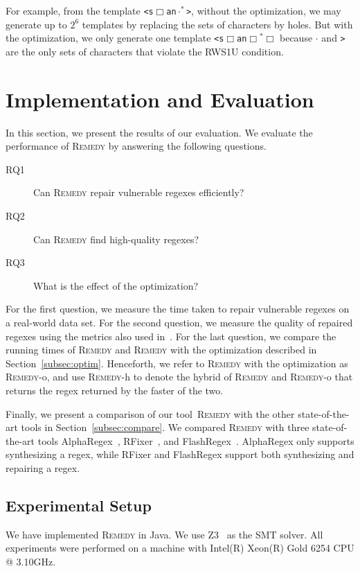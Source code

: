 \documentclass[conference]{IEEEtran}
\newcommand{\tool}{\textsc{Remedy}}
\newcommand{\hole}{\Box}
\newcommand{\any}{\cdot}
\newcommand{\ltp}{RWS1U}
\begin{document}
For example, from the template \texttt{<s$\hole{}$an$\any^*$>}, without the optimization, we may generate up to $2^6$ templates by replacing the sets of characters by holes.
But with the optimization, we only generate one template \texttt{<s$\hole{}$an$\hole{}^*\hole{}$} because $\any$ and \texttt{>} are the only sets of characters that violate the \ltp{} condition.


  


\section{Implementation and Evaluation}
\label{sec:eval}



In this section, we present the results of our evaluation.
We evaluate the performance of \tool{} by answering the following questions.
\begin{description}
\item[RQ1] Can \tool{} repair vulnerable regexes efficiently?
\item[RQ2] Can \tool{} find high-quality regexes?
\item[RQ3] What is the effect of the optimization?
\end{description}

For the first question, we measure the time taken to repair vulnerable regexes on a real-world data set.
For the second question, we measure the quality of repaired regexes using the metrics also used in~\cite{10.1145/3360565}.
For the last question, we compare the running times of \tool{} and \tool{} with the optimization described in Section~\ref{subsec:optim}.
Henceforth, we refer to \tool{} with the optimization as \tool{}-o, and use \tool{}-h to denote the hybrid of \tool{} and \tool{}-o that returns the regex returned by the faster of the two.


Finally, we present a comparison of our tool~\tool{} with the other state-of-the-art tools in Section~\ref{subsec:compare}. We compared \tool{} with three state-of-the-art tools AlphaRegex~\cite{10.1145/3093335.2993244}, RFixer~\cite{10.1145/3360565}, and FlashRegex~\cite{FlashRegex}. AlphaRegex only supports synthesizing a regex, while RFixer and FlashRegex support both synthesizing and repairing a regex.




\subsection{Experimental Setup}
\label{subsec:expsetup}
We have implemented \tool{} in Java.  We use Z3~\cite{10.5555/1792734.1792766} as the SMT solver.
All experiments were performed on a machine with Intel(R) Xeon(R) Gold 6254 CPU @ 3.10GHz.
\end{document}
